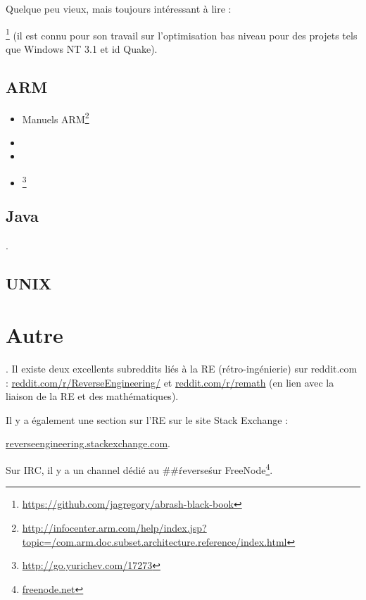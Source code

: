 Quelque peu vieux, mais toujours intéressant à lire :

\MAbrash\footnote{\AlsoAvailableAs \url{https://github.com/jagregory/abrash-black-book}}
(il est connu pour son travail sur l'optimisation bas niveau pour des projets tels que Windows NT 3.1 et id Quake).

\subsection{ARM}

\begin{itemize}
\item Manuels ARM\footnote{\AlsoAvailableAs \url{http://infocenter.arm.com/help/index.jsp?topic=/com.arm.doc.subset.architecture.reference/index.html}}

\item \ARMSevenRef

\item \ARMSixFourRefURL

\item \ARMCookBook\footnote{\AlsoAvailableAs \url{http://go.yurichev.com/17273}}
\end{itemize}


\subsection{Java}

\JavaBook.

\subsection{UNIX}

\TAOUP



\section{Autre}

\HenryWarren.
Il existe deux excellents subreddits liés à la \ac{RE} (rétro-ingénierie) sur reddit.com :
\href{http://go.yurichev.com/17027}{reddit.com/r/ReverseEngineering/} et
\href{http://go.yurichev.com/17028}{reddit.com/r/remath}
(en lien avec la liaison de la \ac{RE} et des mathématiques).

Il y a également une section sur l'\ac{RE} sur le site Stack Exchange :

\par \href{http://go.yurichev.com/17029}{reverseengineering.stackexchange.com}.

Sur IRC, il y a un channel dédié au \#\#\'reverse\' sur
FreeNode\footnote{\href{http://go.yurichev.com/17030}{freenode.net}}.

